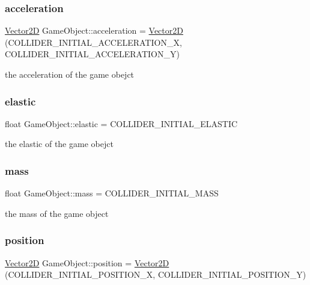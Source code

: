 \subsubsection{\texorpdfstring{acceleration}{acceleration}}
{\footnotesize\ttfamily \mbox{\hyperlink{struct_vector2_d}{Vector2D}} Game\+Object\+::acceleration = \mbox{\hyperlink{struct_vector2_d}{Vector2D}} (C\+O\+L\+L\+I\+D\+E\+R\+\_\+\+I\+N\+I\+T\+I\+A\+L\+\_\+\+A\+C\+C\+E\+L\+E\+R\+A\+T\+I\+O\+N\+\_\+X, C\+O\+L\+L\+I\+D\+E\+R\+\_\+\+I\+N\+I\+T\+I\+A\+L\+\_\+\+A\+C\+C\+E\+L\+E\+R\+A\+T\+I\+O\+N\+\_\+Y)\hspace{0.3cm}{\ttfamily [protected]}}

the acceleration of the game obejct \mbox{\label{class_game_object_a2eb78f1c7e0746c3ddc11ed63cd752ba}} 
\subsubsection{\texorpdfstring{elastic}{elastic}}
{\footnotesize\ttfamily float Game\+Object\+::elastic = C\+O\+L\+L\+I\+D\+E\+R\+\_\+\+I\+N\+I\+T\+I\+A\+L\+\_\+\+E\+L\+A\+S\+T\+IC\hspace{0.3cm}{\ttfamily [protected]}}

the elastic of the game obejct \mbox{\label{class_game_object_acce2dc8ab8ad6c7ad39ded2cb2aee78f}} 
\subsubsection{\texorpdfstring{mass}{mass}}
{\footnotesize\ttfamily float Game\+Object\+::mass = C\+O\+L\+L\+I\+D\+E\+R\+\_\+\+I\+N\+I\+T\+I\+A\+L\+\_\+\+M\+A\+SS\hspace{0.3cm}{\ttfamily [protected]}}

the mass of the game object \mbox{\label{class_game_object_a63c71615f7543ca8f39fc32b9478c6c8}} 
\subsubsection{\texorpdfstring{position}{position}}
{\footnotesize\ttfamily \mbox{\hyperlink{struct_vector2_d}{Vector2D}} Game\+Object\+::position = \mbox{\hyperlink{struct_vector2_d}{Vector2D}} (C\+O\+L\+L\+I\+D\+E\+R\+\_\+\+I\+N\+I\+T\+I\+A\+L\+\_\+\+P\+O\+S\+I\+T\+I\+O\+N\+\_\+X, C\+O\+L\+L\+I\+D\+E\+R\+\_\+\+I\+N\+I\+T\+I\+A\+L\+\_\+\+P\+O\+S\+I\+T\+I\+O\+N\+\_\+Y)\hspace{0.3cm}{\ttfamily [protected]}}

